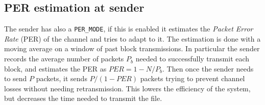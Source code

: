 \subsection{PER estimation at sender}
The sender has also a \texttt{PER\_MODE}, if this is enabled it estimates the \textit{Packet Error Rate} (PER) of the channel and tries to adapt to it. The estimation is done with a moving average on a window of past block transmissions. In particular the sender records the average number of packets $P_b$ needed to successfully transmit each block, and estimates the PER as $PER = 1 - N/P_b$. Then once the sender needs to send $P$ packets, it sends $P/(1-PER)$ packets trying to prevent channel losses without needing retransmission. This lowers the efficiency of the system, but decreases the time needed to transmit the file.

